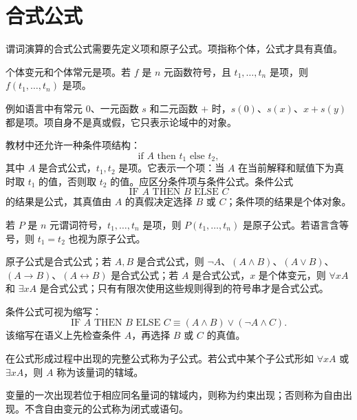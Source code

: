 \section{合式公式}

谓词演算的合式公式需要先定义项和原子公式。项指称个体，公式才具有真值。

\begin{definition}[项]\label{ch2-term}
个体变元和个体常元是项。若 $f$ 是 $n$ 元函数符号，且 $t_1,\ldots,t_n$ 是项，则 $f(t_1,\ldots,t_n)$ 是项。
\end{definition}

例如语言中有常元 $0$、一元函数 $s$ 和二元函数 $+$ 时，$s(0)$、$s(x)$、$x+s(y)$ 都是项。项自身不是真或假，它只表示论域中的对象。

教材中还允许一种条件项结构：
\[
\text{if }A\text{ then }t_1\text{ else }t_2,
\]
其中 $A$ 是合式公式，$t_1,t_2$ 是项。它表示一个项：当 $A$ 在当前解释和赋值下为真时取 $t_1$ 的值，否则取 $t_2$ 的值。应区分条件项与条件公式。条件公式
\[
\text{IF }A\text{ THEN }B\text{ ELSE }C
\]
的结果是公式，其真值由 $A$ 的真假决定选择 $B$ 或 $C$；条件项的结果是个体对象。

\begin{definition}[原子公式]\label{ch2-atom}
若 $P$ 是 $n$ 元谓词符号，$t_1,\ldots,t_n$ 是项，则 $P(t_1,\ldots,t_n)$ 是原子公式。若语言含等号，则 $t_1=t_2$ 也视为原子公式。
\end{definition}

\begin{definition}[谓词演算合式公式]\label{ch2-wff}
原子公式是合式公式；若 $A,B$ 是合式公式，则 $\neg A$、$(A\land B)$、$(A\lor B)$、$(A\to B)$、$(A\leftrightarrow B)$ 是合式公式；若 $A$ 是合式公式，$x$ 是个体变元，则 $\forall xA$ 和 $\exists xA$ 是合式公式；只有有限次使用这些规则得到的符号串才是合式公式。
\end{definition}

条件公式可视为缩写：
\[
\text{IF }A\text{ THEN }B\text{ ELSE }C
\equiv (A\land B)\lor(\neg A\land C).
\]
该缩写在语义上先检查条件 $A$，再选择 $B$ 或 $C$ 的真值。

\begin{definition}[子公式与量词辖域]\label{ch2-subformula-scope}
在公式形成过程中出现的完整公式称为子公式。若公式中某个子公式形如 $\forall xA$ 或 $\exists xA$，则 $A$ 称为该量词的辖域。
\end{definition}

\begin{definition}\label{ch2-free-bound}
变量的一次出现若位于相应同名量词的辖域内，则称为约束出现；否则称为自由出现。不含自由变元的公式称为闭式或语句。
\end{definition}

